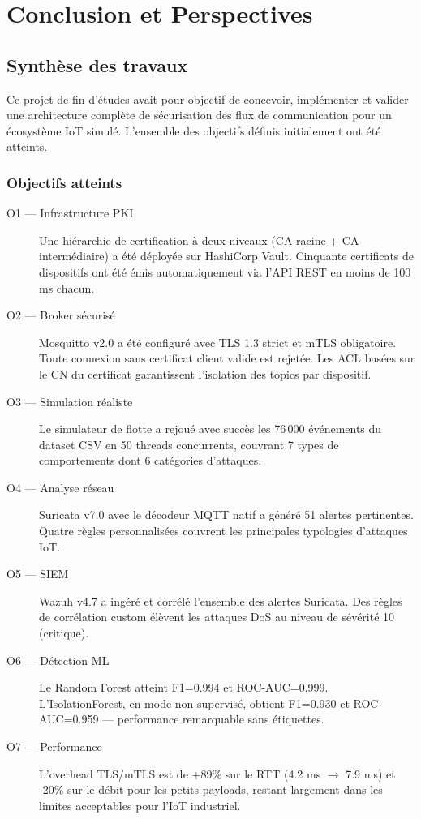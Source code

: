 \chapter{Conclusion et Perspectives}

\section{Synthèse des travaux}

Ce projet de fin d'études avait pour objectif de concevoir, implémenter et valider une architecture complète de sécurisation des flux de communication pour un écosystème IoT simulé. L'ensemble des objectifs définis initialement ont été atteints.

\subsection{Objectifs atteints}

\begin{description}
  \item[O1 — Infrastructure PKI] Une hiérarchie de certification à deux niveaux (CA racine + CA intermédiaire) a été déployée sur HashiCorp Vault. Cinquante certificats de dispositifs ont été émis automatiquement via l'API REST en moins de 100 ms chacun.

  \item[O2 — Broker sécurisé] Mosquitto v2.0 a été configuré avec TLS 1.3 strict et mTLS obligatoire. Toute connexion sans certificat client valide est rejetée. Les ACL basées sur le CN du certificat garantissent l'isolation des topics par dispositif.

  \item[O3 — Simulation réaliste] Le simulateur de flotte a rejoué avec succès les 76\,000 événements du dataset CSV en 50 threads concurrents, couvrant 7 types de comportements dont 6 catégories d'attaques.

  \item[O4 — Analyse réseau] Suricata v7.0 avec le décodeur MQTT natif a généré 51 alertes pertinentes. Quatre règles personnalisées couvrent les principales typologies d'attaques IoT.

  \item[O5 — SIEM] Wazuh v4.7 a ingéré et corrélé l'ensemble des alertes Suricata. Des règles de corrélation custom élèvent les attaques DoS au niveau de sévérité 10 (critique).

  \item[O6 — Détection ML] Le Random Forest atteint F1=0.994 et ROC-AUC=0.999. L'IsolationForest, en mode non supervisé, obtient F1=0.930 et ROC-AUC=0.959 — performance remarquable sans étiquettes.

  \item[O7 — Performance] L'overhead TLS/mTLS est de +89\% sur le RTT (4.2 ms $\to$ 7.9 ms) et -20\% sur le débit pour les petits payloads, restant largement dans les limites acceptables pour l'IoT industriel.
\end{description}

